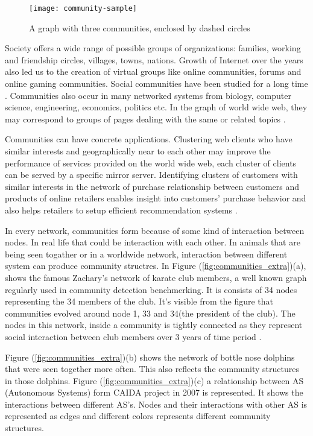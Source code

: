 \vfill
\pagebreak

\begin{figure}[H]
	\centering
	\texttt{[image: community-sample]}
	\caption{A graph with three communities, enclosed by dashed circles}
	\label{fig:community}
\end{figure}

Society offers a wide range of possible groups of organizations: families, working and friendship circles, villages, towns, nations. Growth of Internet over the years also led us to the creation of virtual groups like online communities, forums and online gaming communities. Social communities have been studied for a long time \cite{ref-6}. Communities also occur in many networked systems from biology, computer science, engineering, economics, politics etc. In the graph of world wide web, they may correspond to groups of pages dealing with the same or related topics \cite{ref-36}.

Communities can have concrete applications. Clustering web clients who have similar interests and geographically near to each other may improve the performance of services provided on the world wide web, each cluster of clients can be served by a specific mirror server. Identifying clusters of customers with similar interests in the network of purchase relationship between customers and products of online retailers enables insight into customers' purchase behavior and also helps retailers to setup efficient recommendation systems \cite{ref-37}.

In every network, communities form because of some kind of interaction between nodes. In real life that could be interaction with each other. In animals that are being seen togather or in a worldwide network, interaction between different system can produce community structres. In Figure (\ref{fig:communities_extra})(a), shows the famous Zachary's network of karate club members, a well known graph regularly used in community detection benchmerking. It is consists of 34 nodes representing the 34 members of the club. It's visible from the figure that communities evolved around node 1, 33 and 34(the president of the club). The nodes in this network, inside a community is tightly connected as they represent social interaction between club members over 3 years of time period \cite{ref-58}.

Figure (\ref{fig:communities_extra})(b) shows the network of bottle nose dolphins that were seen together more often. This also reflects the community structures in those dolphins. Figure (\ref{fig:communities_extra})(c) a relationship between AS (Autonomous Systems) form CAIDA project in 2007 is represented. It shows the interactions between different AS's. Nodes and their interactions with other AS is represented as edges and different colors represents different community structures.

